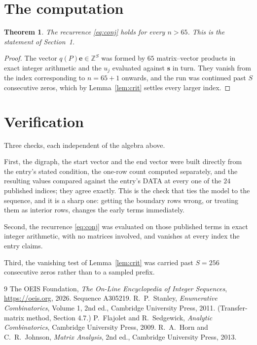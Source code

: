\documentclass[11pt,a4paper]{article}
\theoremstyle{plain}
\newtheorem{theorem}{Theorem}
\theoremstyle{definition}
\begin{document}
\section{The computation}

\begin{theorem}
The recurrence \eqref{eq:conj} holds for every $n>65$. This is the statement of
Section~1.
\end{theorem}

\begin{proof}
The vector $q(P)\mathbf{e}\in\mathbb{Z}^{S}$ was formed by $65$ matrix--vector
products in exact integer arithmetic and the $u_j$ evaluated against $\mathbf{s}$ in turn.
They vanish from the index corresponding to $n=65+1$ onwards, and the run was continued
past $S$ consecutive zeros, which by Lemma~\ref{lem:crit} settles every larger index.
\end{proof}

\section{Verification}

Three checks, each independent of the algebra above.

First, the digraph, the start vector and the end vector were built directly from the
entry's stated condition, the one-row count computed separately, and the resulting values
compared against the entry's DATA at every one of the $24$ published indices; they
agree exactly. This is the check that ties the model to the sequence, and it is a sharp one:
getting the boundary rows wrong, or treating them as interior rows, changes the early terms
immediately.

Second, the recurrence \eqref{eq:conj} was evaluated on those published terms in exact
integer arithmetic, with no matrices involved, and vanishes at every index the entry claims.

Third, the vanishing test of Lemma~\ref{lem:crit} was carried past $S=256$ consecutive
zeros rather than to a sampled prefix.

\begin{thebibliography}{9}
 The OEIS Foundation, \emph{The On-Line Encyclopedia of Integer
Sequences}, \url{https://oeis.org}, 2026. Sequence A305219.
 R.~P.~Stanley, \emph{Enumerative Combinatorics}, Volume 1, 2nd ed.,
Cambridge University Press, 2011. (Transfer-matrix method, Section 4.7.)
 P.~Flajolet and R.~Sedgewick, \emph{Analytic Combinatorics}, Cambridge
University Press, 2009.
 R.~A.~Horn and C.~R.~Johnson, \emph{Matrix Analysis}, 2nd ed., Cambridge
University Press, 2013.
\end{thebibliography}
\end{document}
